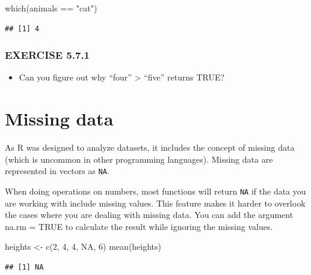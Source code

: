 \documentclass[
]{book}
\newenvironment{Shaded}{\begin{snugshade}}{\end{snugshade}}
\newcommand{\ConstantTok}[1]{\textcolor[rgb]{0.00,0.00,0.00}{#1}}
\newcommand{\DecValTok}[1]{\textcolor[rgb]{0.00,0.00,0.81}{#1}}
\newcommand{\FunctionTok}[1]{\textcolor[rgb]{0.00,0.00,0.00}{#1}}
\newcommand{\NormalTok}[1]{#1}
\newcommand{\OtherTok}[1]{\textcolor[rgb]{0.56,0.35,0.01}{#1}}
\newcommand{\SpecialCharTok}[1]{\textcolor[rgb]{0.00,0.00,0.00}{#1}}
\newcommand{\StringTok}[1]{\textcolor[rgb]{0.31,0.60,0.02}{#1}}
\providecommand{\tightlist}{%
  \setlength{\itemsep}{0pt}\setlength{\parskip}{0pt}}
\begin{document}
\begin{Shaded}
\begin{Highlighting}[]
\FunctionTok{which}\NormalTok{(animals }\SpecialCharTok{==} \StringTok{"cat"}\NormalTok{)}
\end{Highlighting}
\end{Shaded}

\begin{verbatim}
## [1] 4
\end{verbatim}

\hypertarget{exercise-5.7.1}{%
\subsubsection*{EXERCISE 5.7.1}\label{exercise-5.7.1}}

\begin{itemize}
\tightlist
\item
  Can you figure out why ``four'' \textgreater{} ``five'' returns TRUE?
\end{itemize}

\hypertarget{missing-data}{%
\section{Missing data}\label{missing-data}}

As R was designed to analyze datasets, it includes the concept of missing data (which is uncommon in other programming languages). Missing data are represented in vectors as \texttt{NA}.

When doing operations on numbers, most functions will return \texttt{NA} if the data you are working with include missing values. This feature makes it harder to overlook the cases where you are dealing with missing data. You can add the argument na.rm = TRUE to calculate the result while ignoring the missing values.

\begin{Shaded}
\begin{Highlighting}[]
\NormalTok{heights }\OtherTok{\textless{}{-}} \FunctionTok{c}\NormalTok{(}\DecValTok{2}\NormalTok{, }\DecValTok{4}\NormalTok{, }\DecValTok{4}\NormalTok{, }\ConstantTok{NA}\NormalTok{, }\DecValTok{6}\NormalTok{)}
\FunctionTok{mean}\NormalTok{(heights)}
\end{Highlighting}
\end{Shaded}

\begin{verbatim}
## [1] NA
\end{verbatim}
\end{document}
